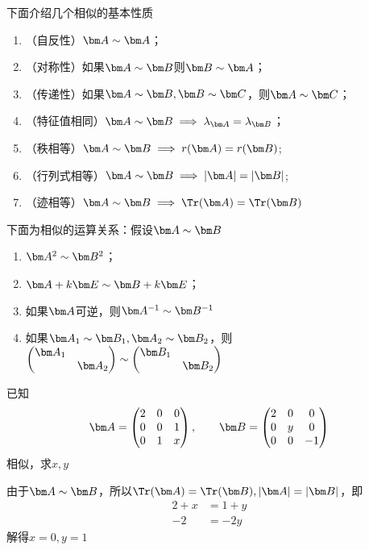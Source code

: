 下面介绍几个相似的基本性质
\begin{enumerate}[(1)]
    \item （自反性）$\mat{A}\sim \mat{A}$；
    \item （对称性）如果$\mat{A}\sim \mat{B}$则$\mat{B} \sim \mat{A}$；
    \item （传递性）如果$\mat{A}\sim \mat{B}, \mat{B} \sim \mat{C}$，则$\mat{A}\sim \mat{C}$；
    \item （特征值相同）$\mat{A}\sim \mat{B} \implies \lambda_{\mat{A}} = \lambda_{\mat{B}}$；
    \item （秩相等）$\mat{A}\sim \mat{B} \implies r(\mat{A})=r(\mat{B})$;
    \item （行列式相等）$\mat{A}\sim \mat{B} \implies |\mat{A}|=|\mat{B}|$;
    \item （迹相等）$\mat{A}\sim \mat{B} \implies \Tr(\mat{A}) = \Tr(\mat{B})$
\end{enumerate}

下面为相似的运算关系：假设$\mat{A}\sim \mat{B}$
\begin{enumerate}[(1)]
    \item $\mat{A}^2 \sim \mat{B}^2$；
    \item $\mat{A}+k\mat{E} \sim \mat{B} + k\mat{E}$；
    \item 如果$\mat{A}$可逆，则$\mat{A}^{-1}\sim \mat{B}^{-1}$
    \item 如果$\mat{A}_1\sim \mat{B}_1, \mat{A}_2\sim \mat{B}_2$，则
          $
              \begin{pmatrix}
                  \mat{A}_1 &           \\
                            & \mat{A}_2
              \end{pmatrix}
              \sim
              \begin{pmatrix}
                  \mat{B}_1 &           \\
                            & \mat{B}_2
              \end{pmatrix}
          $
\end{enumerate}

\begin{example}
    已知
    \[
        \mat{A} =
        \begin{pmatrix}
            2 & 0 & 0 \\
            0 & 0 & 1 \\
            0 & 1 & x
        \end{pmatrix}
        ,\qquad
        \mat{B} =
        \begin{pmatrix}
            2 & 0 & 0  \\
            0 & y & 0  \\
            0 & 0 & -1
        \end{pmatrix}
    \]
    相似，求$x,y$
\end{example}
\begin{solution}
    由于$\mat{A}\sim \mat{B}$，所以$\Tr(\mat{A})=\Tr(\mat{B}),|\mat{A}|=|\mat{B}|$，即
    \begin{align*}
        2+x & = 1+y \\
        -2  & = -2y
    \end{align*}
    解得$x=0,y=1$
\end{solution}

